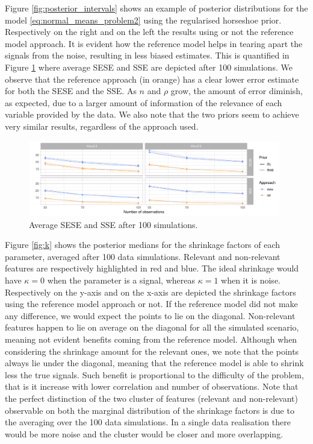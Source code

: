 \documentclass[american,]{article}
\theoremstyle{definition}
\begin{document}
Figure \ref{fig:posterior_intervals} shows an example of posterior distributions for the model \eqref{eq:normal_means_problem2} using the regularised horseshoe prior. Respectively on the right and on the left the results using or not the reference model approach. It is evident how the reference model helps in tearing apart the signals from the noise, resulting in less biased estimates. This is quantified in Figure \ref{fig:SESE_SSE} where average SESE and SSE are depicted after 100 simulations. We observe that the reference approach (in orange) has a clear lower error estimate for both the SESE and the SSE. As $n$ and $\rho$ grow, the amount of error diminish, as expected, due to a larger amount of information of the relevance of each variable provided by the data. We also note that the two priors seem to achieve very similar results, regardless of the approach used.

\begin{figure}[tp]
  \centering
  \includegraphics[width=0.98\textwidth]{graphics/SESE_SSE.pdf}
  \caption{Average SESE and SSE after 100 simulations.\\}
  \label{fig:SESE_SSE}
\end{figure}

Figure \ref{fig:k} shows the posterior medians for the shrinkage factors of each parameter, averaged after 100 data simulations. Relevant and non-relevant features are respectively highlighted in red and blue. The ideal shrinkage would have $\kappa=0$ when the parameter is a signal, whereas $\kappa=1$ when it is noise. Respectively on the y-axis and on the x-axis are depicted the shrinkage factors using the reference model approach or not. If the reference model did not make any difference, we would expect the points to lie on the diagonal. Non-relevant features happen to lie on average on the diagonal for all the simulated scenario, meaning not evident benefits coming from the reference model. Although when considering the shrinkage amount for the relevant ones, we note that the points always lie under the diagonal, meaning that the reference model is able to shrink less the true signals. Such benefit is proportional to the difficulty of the problem, that is it increase with lower correlation and number of observations. Note that the perfect distinction of the two cluster of features (relevant and non-relevant) observable on both the marginal distribution of the shrinkage factors is due to the averaging over the 100 data simulations. In a single data realisation there would be more noise and the cluster would be closer and more overlapping.
\end{document}
